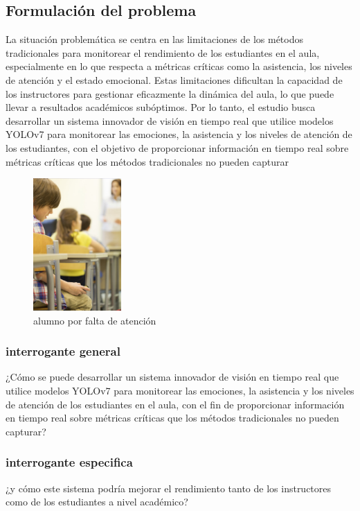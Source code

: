\documentclass[12pt]{article}
\begin{document}
\subsection{Formulación del problema}
La situación problemática se centra en las limitaciones de los métodos tradicionales para monitorear el rendimiento de los estudiantes en el aula, especialmente en lo que respecta a métricas críticas como la asistencia, los niveles de atención y el estado emocional. Estas limitaciones dificultan la capacidad de los instructores para gestionar eficazmente la dinámica del aula, lo que puede llevar a resultados académicos subóptimos. Por lo tanto, el estudio busca desarrollar un sistema innovador de visión en tiempo real que utilice modelos YOLOv7 para monitorear las emociones, la asistencia y los niveles de atención de los estudiantes, con el objetivo de proporcionar información en tiempo real sobre métricas críticas que los métodos tradicionales no pueden capturar
\begin{figure}[!h]
    \centering
    \includegraphics[width=0.3\textwidth]{images/falta_atencion.png}
    \caption{alumno por falta de atención} 
\end{figure}
\subsubsection{interrogante general} 
¿Cómo se puede desarrollar un sistema innovador de visión en tiempo real que utilice modelos YOLOv7 para monitorear las emociones, la asistencia y los niveles de atención de los estudiantes en el aula, con el fin de proporcionar información en tiempo real sobre métricas críticas que los métodos tradicionales no pueden capturar?
\subsubsection{interrogante especifica}
¿y cómo este sistema podría mejorar el rendimiento tanto de los instructores como de los estudiantes a nivel académico?
\end{document}
